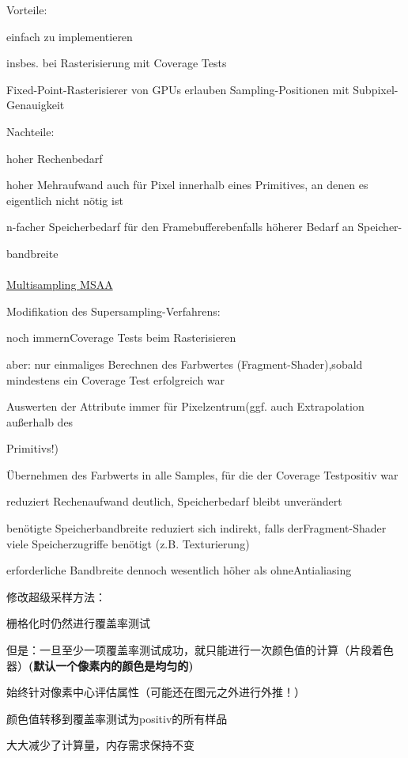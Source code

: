 \documentclass[fleqn]{article}
\begin{document}
\noindent Vorteile:

einfach zu implementieren

\indent\indent insbes. bei Rasterisierung mit Coverage Tests
 
\indent\indent Fixed-Point-Rasterisierer von GPUs erlauben Sampling-Positionen mit Subpixel-Genauigkeit
 
\noindent Nachteile:

hoher Rechenbedarf

\indent\indent hoher Mehraufwand auch für Pixel innerhalb eines Primitives, an denen es eigentlich nicht
\indent nötig ist
 
\indent\indent n-facher Speicherbedarf für den Framebufferebenfalls höherer Bedarf an Speicher-

\indent bandbreite
\\
\\
\underline{Multisampling MSAA}

\noindent Modifikation des Supersampling-Verfahrens:

noch immernCoverage Tests beim Rasterisieren

aber: nur einmaliges Berechnen des Farbwertes (Fragment-Shader),sobald mindestens ein Coverage Test erfolgreich war

\indent\indent Auswerten der Attribute immer für Pixelzentrum(ggf. auch Extrapolation außerhalb des 

\indent\indent Primitivs!)

Übernehmen des Farbwerts in alle Samples, für die der Coverage Testpositiv war

\noindent reduziert Rechenaufwand deutlich, Speicherbedarf bleibt unverändert

benötigte Speicherbandbreite reduziert sich indirekt, falls derFragment-Shader viele Speicherzugriffe benötigt (z.B. Texturierung)

erforderliche Bandbreite dennoch wesentlich höher als ohneAntialiasing

\noindent 修改超级采样方法：

栅格化时仍然进行覆盖率测试

但是：一旦至少一项覆盖率测试成功，就只能进行一次颜色值的计算（片段着色器）\textbf{(默认一个像素内的颜色是均匀的)}

\indent\indent  始终针对像素中心评估属性（可能还在图元之外进行外推！）

颜色值转移到覆盖率测试为positiv的所有样品

\noindent 大大减少了计算量，内存需求保持不变
\end{document}
